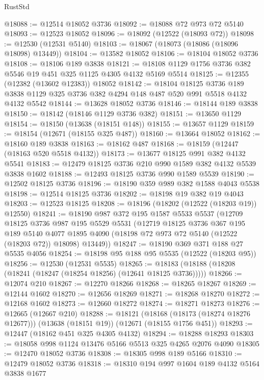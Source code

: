 \begin{lexlean}{RustStd}
\begin{coremodule}
@18088 := @12514 @18052 @3736
@18092 := @18088 @72 @973 @72 @5140
@18093 := @12523 @18052
@18096 := @18092 (@12522 (@18093 @72))
@18098 := @12530 (@12531 @5140)
@18103 := @18067 (@18073 (@18086 (@18096 @18098) @13449))
@18104 := @13582 @18052
@18106 := @18104 @18052 @3736
@18108 := @18106 @189 @3838
@18121 := @18108 @1129 @1756 @3736 @382 @5546 @19 @451 @325 @1125 @4305 @4132 @5169 @5514
@18125 := @12355 (@12382 (@13602 @12383)) @18052
@18142 := @18104
    @18125
    @3736
    @189
    @3838
    @1129
    @325
    @3736
    @382
    @4294
    @148
    @487
    @520
    @991
    @5518
    @4132
    @4132
    @5542
@18144 := @13628 @18052 @3736
@18146 := @18144 @189 @3838
@18150 := @18142 (@18146 @1129 @3736 @382)
@18151 := @13650 @1129
@18154 := @18150 (@13638 (@18151 @148))
@18155 := @13657 @1129
@18159 := @18154 (@12671 (@18155 @325 @487))
@18160 := @13664 @18052
@18162 := @18160 @189 @3838
@18163 := @18162 @487
@18168 := @18159 (@12447 (@18163 @520 @5518 @4132))
@18173 := @13677 @18125 @991 @382 @4132 @5541
@18183 := @12479 @18125 @3736 @210 @990 @1589 @382 @4132 @5539 @3838 @1602
@18188 := @12493 @18125 @3736 @990 @1589 @5539
@18190 := @12502 @18125 @3736
@18196 := @18190 @359 @989 @382 @1588 @4043 @5538
@18198 := @12514 @18125 @3736
@18202 := @18198 @19 @382 @19 @4043
@18203 := @12523 @18125
@18208 := @18196 (@18202 (@12522 (@18203 @19)) @12550)
@18241 := @18190
    @987
    @372
    @195
    @1587
    @5533
    @5537
    (@12709
      @18125
      @3736
      @987
      @195
      @5529
      @5531
      (@12719
        @18125
        @3736
        @367
        @195
        @189
        @5140
        @4077
        @1895
        @4090
        (@18198 @72 @973 @72 @5140 (@12522 (@18203 @72)) @18098)
        @13449))
@18247 := @18190 @369 @371 @188 @27 @5535 @4056
@18254 := @18198 @95 @188 @95 @5535 (@12522 (@18203 @95))
@18256 := @12530 (@12531 @5535)
@18265 := @18183 (@18188 (@18208 (@18241 (@18247 (@18254 @18256) (@12641 @18125 @3736)))))
@18266 := @12074 @210
@18267 := @12270 @18266
@18268 := @18265 @18267
@18269 := @12144 @1602
@18270 := @12656 @18269
@18271 := @18268 @18270
@18272 := @12168 @1602
@18273 := @12660 @18272
@18274 := @18271 @18273
@18276 := @12665 (@12667 @210)
@18288 := @18121
    (@18168 (@18173 (@18274 @18276 @12677)))
    (@13638 (@18151 @19))
    (@12671 (@18155 @1756 @451))
@18293 := @12447 (@18162 @451 @325 @4305 @4132)
@18294 := @18288 @18293
@18303 := @18058 @998 @1124 @13476 @5166 @5513 @325 @4265 @2076 @4090
@18305 := @12470 @18052 @3736
@18308 := @18305 @998 @189 @5166
@18310 := @12479 @18052 @3736
@18318 := @18310 @194 @997 @1604 @189 @4132 @5164 @3838 @1677

\end{coremodule}
\end{lexlean}
